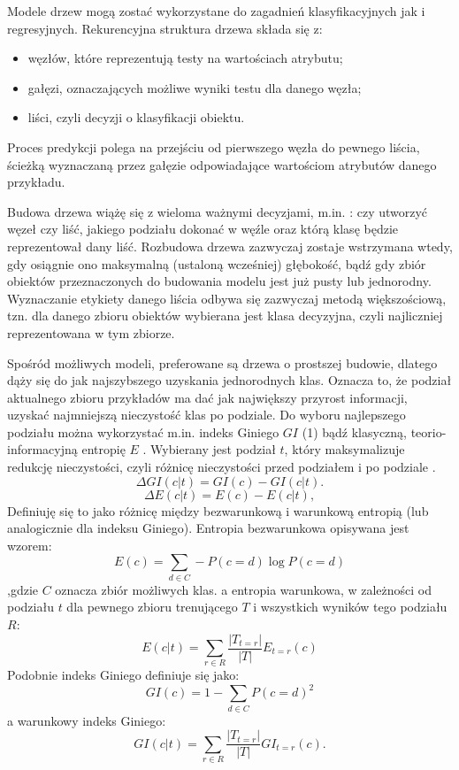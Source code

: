 Modele drzew mogą zostać wykorzystane do zagadnień klasyfikacyjnych jak i regresyjnych.
Rekurencyjna struktura drzewa składa się z:
\begin{itemize}
    \item węzłów, które reprezentują testy na wartościach atrybutu;
    \item gałęzi, oznaczających możliwe wyniki testu dla danego węzła;
    \item liści, czyli decyzji o klasyfikacji obiektu.
\end{itemize}
Proces predykcji polega na przejściu od pierwszego węzła do pewnego liścia, ścieżką wyznaczaną przez gałęzie odpowiadające wartościom atrybutów danego przykładu.

Budowa drzewa wiążę się z wieloma ważnymi decyzjami, m.in. : czy utworzyć węzeł czy liść,  jakiego podziału dokonać w węźle oraz którą klasę będzie reprezentował dany liść. Rozbudowa drzewa zazwyczaj zostaje wstrzymana wtedy, gdy osiągnie ono maksymalną (ustaloną wcześniej) głębokość, bądź gdy zbiór obiektów przeznaczonych do budowania modelu jest już pusty lub jednorodny. Wyznaczanie etykiety danego liścia odbywa się zazwyczaj metodą większościową, tzn.  dla danego zbioru obiektów wybierana jest klasa
decyzyjna, czyli najliczniej reprezentowana w tym zbiorze.

Spośród możliwych modeli, preferowane są drzewa o prostszej budowie, dlatego dąży się do jak najszybszego uzyskania jednorodnych klas. Oznacza to, że podział aktualnego zbioru przykładów ma dać jak największy przyrost informacji, uzyskać najmniejszą nieczystość
klas po podziale. Do wyboru najlepszego podziału można wykorzystać m.in. indeks Giniego $GI$ (1) bądź klasyczną, teorio-informacyjną entropię $E$ \cite{SuthaharanShan2015MLMa}. Wybierany jest podział $t$, który maksymalizuje redukcję nieczystości, czyli
różnicę nieczystości przed podziałem i po podziale \cite{MOW}.
\begin{equation}
 \Delta GI(c|t) = GI(c)-GI(c|t).      
 \end{equation}
 \begin{equation}
    \Delta E(c|t) = E(c)-E(c|t),
\end{equation}
Definiuję się to jako różnicę między bezwarunkową i warunkową entropią (lub
analogicznie dla indeksu Giniego).
Entropia bezwarunkowa opisywana jest wzorem:
\begin{equation}
    E(c) = \sum_{d\in C} - P(c=d)\log P(c=d)
\end{equation}
,gdzie $C$ oznacza zbiór możliwych klas.
a entropia warunkowa, w zależności od podziału $t$ dla pewnego zbioru trenującego $T$ i wszystkich wyników tego podziału $R$:
\begin{equation}
    E(c|t) = \sum_{r\in R} \frac{|T_{t=r}|}{|T|}E_{t=r}(c)
\end{equation}
Podobnie indeks Giniego definiuje się jako:
\begin{equation}
    GI(c) = 1- \sum_{d\in C}P(c=d)^2
\end{equation}
a warunkowy indeks Giniego:
\begin{equation}
      GI(c|t) = \sum_{r\in R} \frac{|T_{t=r}|}{|T|}GI_{t=r}(c).
\end{equation}

